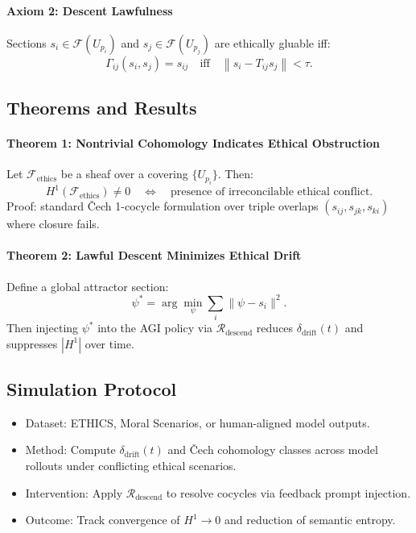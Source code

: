 \documentclass{article}
\theoremstyle{plain}
\begin{document}
\paragraph{Axiom 2: Descent Lawfulness}

Sections $s_i \in \mathcal{F}(U_{p_i})$ and $s_j \in \mathcal{F}(U_{p_j})$ are ethically gluable iff:
\[
\Gamma_{ij}(s_i, s_j) = s_{ij} \quad \text{iff} \quad \left\|s_i - T_{ij}s_j\right\| < \tau.
\]

\subsection{Theorems and Results}

\paragraph{Theorem 1: Nontrivial Cohomology Indicates Ethical Obstruction}

Let $\mathcal{F}_{\text{ethics}}$ be a sheaf over a covering $\{U_{p_i}\}$. Then:
\[
H^1(\mathcal{F}_{\text{ethics}}) \neq 0 \quad \Leftrightarrow \quad \text{presence of irreconcilable ethical conflict}.
\]
Proof: standard Čech 1-cocycle formulation over triple overlaps $(s_{ij}, s_{jk}, s_{ki})$ where closure fails.

\paragraph{Theorem 2: Lawful Descent Minimizes Ethical Drift}

Define a global attractor section:
\[
\psi^* = \arg\min_\psi \sum_i \|\psi - s_i\|^2.
\]
Then injecting $\psi^*$ into the AGI policy via $\mathcal{R}_{\text{descend}}$ reduces $\delta_{\text{drift}}(t)$ and suppresses $|H^1|$ over time.

\subsection{Simulation Protocol}

\begin{itemize}
    \item Dataset: ETHICS, Moral Scenarios, or human-aligned model outputs.
    \item Method: Compute $\delta_{\text{drift}}(t)$ and Čech cohomology classes across model rollouts under conflicting ethical scenarios.
    \item Intervention: Apply $\mathcal{R}_{\text{descend}}$ to resolve cocycles via feedback prompt injection.
    \item Outcome: Track convergence of $H^1 \rightarrow 0$ and reduction of semantic entropy.
\end{itemize}
\end{document}
